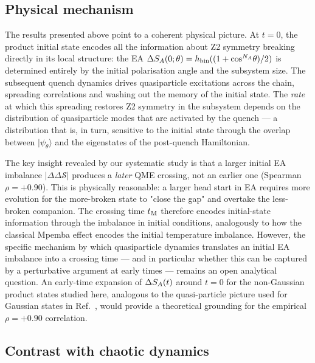 \label{sec:discussion}

\subsection{Physical mechanism}
\label{sec:mechanism}

The results presented above point to a coherent physical picture.
At $t = 0$, the product initial state encodes all the information about Z2 symmetry
breaking directly in its local structure: the EA $\Delta S_A(0;\theta) = h_{\rm bin}((1+\cos^{N_A}\!\theta)/2)$
is determined entirely by the initial polarisation angle and the subsystem size.
The subsequent quench dynamics drives quasiparticle excitations across the chain,
spreading correlations and washing out the memory of the initial state.
The \emph{rate} at which this spreading restores Z2 symmetry in the subsystem
depends on the distribution of quasiparticle modes that are activated by the quench —
a distribution that is, in turn, sensitive to the initial state through the overlap
between $|\psi_\theta\rangle$ and the eigenstates of the post-quench Hamiltonian.

The key insight revealed by our systematic study is that a larger initial EA imbalance
$|\Delta\Delta\mathcal{S}|$ produces a \emph{later} QME crossing, not an earlier one
(Spearman $\rho = +0.90$).
This is physically reasonable: a larger head start in EA requires more evolution for
the more-broken state to "close the gap" and overtake the less-broken companion.
The crossing time $t_{\rm M}$ therefore encodes initial-state information through the
imbalance in initial conditions, analogously to how the classical Mpemba effect
encodes the initial temperature imbalance.
However, the specific mechanism by which quasiparticle dynamics translates an initial
EA imbalance into a crossing time — and in particular whether this can be captured by
a perturbative argument at early times — remains an open analytical question.
An early-time expansion of $\Delta S_A(t)$ around $t=0$ for the non-Gaussian product states
studied here, analogous to the quasi-particle picture used for Gaussian states
in Ref.~\cite{Rylands2024}, would provide a theoretical grounding for the
empirical $\rho=+0.90$ correlation.

\subsection{Contrast with chaotic dynamics}
\label{sec:chaos}

